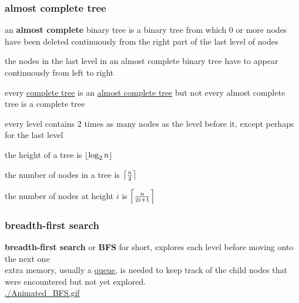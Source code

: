 \documentclass[a4paper,12pt]{article}
\DeclarePairedDelimiter\ceil{\lceil}{\rceil}
\DeclarePairedDelimiter\floor{\lfloor}{\rfloor}
\begin{document}
\subsubsection{almost complete tree}
\label{sec:orgcd32ba8}
\begin{definition}
an \textbf{almost complete} binary tree is a binary tree from which 0 or more nodes have been deleted continuously from the right part of the last level of nodes\\[0pt]
\begin{characteristic}
the nodes in the last level in an almost complete binary tree have to appear continuously from left to right\\[0pt]
\end{characteristic}

\begin{characteristic}
every \hyperref[sec:org8d4eeb6]{complete tree} is an \hyperref[sec:orgcd32ba8]{almost complete tree} but not every almost complete tree is a complete tree\\[0pt]
\end{characteristic}

\begin{characteristic}
every level contains 2 times as many nodes as the level before it, except perhaps for the last level\\[0pt]
\end{characteristic}

\begin{characteristic}
the height of a tree is \(\floor*{\log_2 n}\)\\[0pt]
\end{characteristic}

\begin{characteristic}
the number of nodes in a tree is \(\ceil*{\frac{n}{2}}\)\\[0pt]
\end{characteristic}

\begin{characteristic}
the number of nodes at height \(i\) is \(\ceil*{\frac{n}{2i+1}}\)\\[0pt]
\end{characteristic}
\end{definition}
\subsubsection{breadth-first search}
\label{sec:org5127bc8}
\textbf{breadth-first search} or \textbf{BFS} for short, explores each level before moving onto the next one\\[0pt]
extra memory, usually a \hyperref[sec:orga0bf8b2]{queue}, is needed to keep track of the child nodes that were encountered but not yet explored.\\[0pt]
\url{./Animated\_BFS.gif}\\[0pt]
\end{document}
